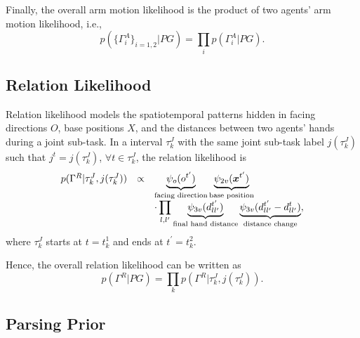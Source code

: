 \documentclass[letterpaper, 10 pt, conference]{ieeeconf}  %
\def \xb{\bm{x}} %
\begin{document}
Finally, the overall arm motion likelihood is the product of two agents' arm motion likelihood, i.e.,
\begin{equation}
p(\{\Gamma_i^A\}_{i=1,2} | PG) = \prod_i p(\Gamma_i^A | PG).
\end{equation}

\subsection{Relation Likelihood}

Relation likelihood models the spatiotemporal patterns hidden in facing directions $O$, base positions $X$, and the distances between two agents' hands during a joint sub-task. In a interval $\tau_k^J$ with the same joint sub-task label $j(\tau_k^J)$ such that $j^t = j(\tau_k^J)$, $\forall t \in \tau_k^J$, the relation likelihood is
\begin{equation}
\begin{array}{lcl}
\setlength{\arraycolsep}{0pt}
p(\Gamma^R | \tau_k^J, j(\tau_k^J)) &\propto& \displaystyle \underbrace{\psi_{o}(o^{t^\prime})}_{\text{facing direction}} \underbrace{\psi_{2v}(\xb^{t^\prime})}_{\text{base position}}\\
&& \displaystyle \cdot \prod_{l,l^\prime}\underbrace{\psi_{3v}(d_{ll^\prime}^{t^\prime})}_{\text{final hand distance}}\underbrace{\psi_{3v}(d_{ll^\prime}^{t^\prime} - d_{ll^\prime}^{t})}_{\text{distance change}},
\end{array}
\label{eq:relation_ll_interval}
\end{equation}
where $\tau^J_{k}$ starts at $t = t_k^1$ and ends at $t^\prime = t_k^2$.

Hence, the overall relation likelihood can be written as
\begin{equation}
p(\Gamma^R | PG) = \prod_k p(\Gamma^R | \tau_k^J, j(\tau_k^J)).
\end{equation}

\subsection{Parsing Prior}
\end{document}
